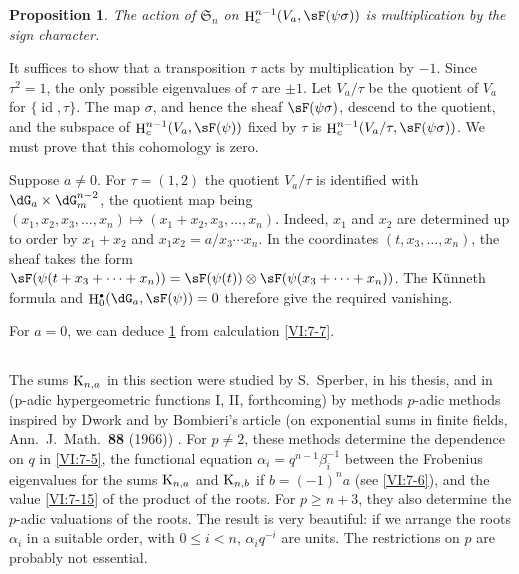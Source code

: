 \documentclass[oneside]{book}
\DeclareMathOperator{\h}{H}
\newcounter{char}
\newcommand{\kloos}{\textnormal{K}} %
\theoremstyle{sga-source}
\theoremstyle{sga-source-dash}
\theoremstyle{sga-source-dotdash}
\theoremstyle{sga-source-number-note-dash}
\theoremstyle{sga-source-note-number-dotdash}
\theoremstyle{sga-source-example-dotdash}
\theoremstyle{sga-source-inline-number}
\theoremstyle{sga-source-bare-number}
\theoremstyle{sga-source}
\newtheorem{proposition_}[subsection]{Proposition}
\let\oldbullet\bullet
\renewcommand{\bullet}{\textnormal{\tiny$\oldbullet$}}
\newcommand{\PrintPage}[1]{}\newcommand{\MathPage}[1]{}\newcommand{\PrintCite}[2]{#1}\newcommand{\var}[3]{#1}
\begin{document}
\begin{proposition_}\label{VI:7-20}
The action of $\mathfrak{S}_n$ on $\h_c^{n-1}(V_a,\sF(\psi\sigma))$ is multiplication 
by the sign character. 
\end{proposition_}

It suffices to show that a transposition $\tau$ acts by multiplication 
by $-1$. Since $\tau^2=1$, the only possible eigenvalues of $\tau$ are 
$\pm 1$. Let $V_a/\tau$ be the quotient of $V_a$ for 
$\{\operatorname{id},\tau\}$. The map $\sigma$, and hence the sheaf 
$\sF(\psi\sigma)$, descend to the quotient, and the subspace of 
  $\h_c^{n-1}(V_a,\sF(\psi))$ fixed by 
$\tau$ is $\h_c^{n-1}(V_a/\tau,\sF(\psi\sigma))$. We must prove that 
this cohomology is zero. 

Suppose $a\ne 0$. For $\tau=(1,2)$ the quotient $V_a/\tau$ is identified 
with $\dG_a\times \dG_m^{n-2}$, the quotient map being 
$(x_1,x_2,x_3,\dots,x_n)\mapsto (x_1+x_2,x_3,\dots,x_n)$. Indeed, $x_1$ and 
$x_2$ are determined \PrintPage{229}
up to order by $x_1+x_2$ and 
$x_1x_2 = a/x_3\dotsm x_n$. In the coordinates $(t,x_3,\dots,x_n)$, the 
sheaf takes the form 
$\sF(\psi(t+x_3+\cdots + x_n)) = \sF(\psi(t))\otimes \sF(\psi(x_3+\cdots + x_n))$. 
  The K\"unneth formula and $\var{\h_0^\bullet(\dG_a,\sF(\psi))}{\h_c^\bullet(\dG_a,\sF(\psi))}{S45-SOL-0973} = 0$ therefore give 
the required vanishing. 

For $a=0$, we can deduce \ref{VI:7-20} from calculation \ref{VI:7-7}. 





\subsection{}\label{VI:7-21}

The sums $\kloos_{n,a}$ in this section were studied by 
S.\ Sperber, in his thesis, and in (p-adic hypergeometric functions I, II, forthcoming) \cite{sp77} by methods 
$p$-adic methods inspired by Dwork and by Bombieri's article (on exponential sums in finite fields, Ann.~J.~Math.~\textbf{88} (1966)) \cite{bo66}. 
For $p\ne 2$, these methods determine the dependence on $q$ in \ref{VI:7-5}, 
the functional equation $\alpha_i = q^{n-1} \beta_i^{-1}$ between the 
Frobenius eigenvalues for the sums $\kloos_{n,a}$ and 
$\kloos_{n,b}$ if $b=(-1)^n a$ (see \ref{VI:7-6}), and the value \ref{VI:7-15} 
of the product of the roots. For $p\geqslant n+3$, they also determine the 
$p$-adic valuations of the roots. The result is very beautiful: if we arrange 
the roots $\alpha_i$ in a suitable order, with 
  $0\leqslant i<n$, $\alpha_i q^{-i}$ are units. The 
restrictions on $p$ are probably not essential. 
\end{document}
